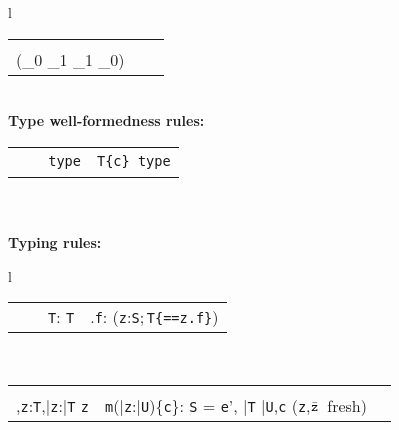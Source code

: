 \begin{figure*}
\begin{tabular}{l}
{\begin{tabular}{p{}p{}p{}}
&
\infrule[Equals]
        {\Gamma \vdash {\tt t}_0: {\tt T}_0
        \andalso
        \Gamma \vdash {\tt t}_1: {\tt T}_1 \\
          (\Gamma \vdash {\tt T}_0 \subtype {\tt T}_1 \vee
          \Gamma \vdash {\tt T}_1 \subtype {\tt T}_0)}
        {\Gamma \vdash {\tt t}_0{\tt ==}{\tt t}_1:o}
\\
\end{tabular}}
\quad\\
{\bf Type well-formedness rules:}\\[-12pt]
{\tabcolsep=0pt
\begin{tabular}{p{}p{}p{}}
\infrule[Class]
	{\Gamma \vdash \klass({\tt C})}
	{\Gamma \vdash {\tt C}\ \type} 
&
\infrule[Exists-T]
	{\Gamma\tt \vdash {\tt S}\ \type, {\tt T}\ \type}
	{\Gamma\tt \vdash {\tt x:S;T}\ {\tt type}} 
&
\infrule[Dep]
	{\Gamma\tt \vdash T\ \type \andalso \Gamma, \self:T \vdash c:o}
	{\Gamma\tt \vdash T\{c\}\ {\tt type}} 
\\
\end{tabular}}
\quad\\
\quad\\
{\bf Typing rules:}\\[-12pt]
{\tabcolsep=0pt
\begin{tabular}{l}
\begin{tabular}{p{}p{}p{}}
\infax[T-Var]
      {\Gamma, {\tt x}:{\tt T} \vdash {\tt x}:{\tt T\{\self==x\}}}
&
\infrule[T-Cast]
	{\Gamma \vdash {\tt e}:{\tt U} \andalso \Gamma \vdash {\tt T} \ \type}
	{\Gamma \vdash {\tt e}\ \as\ {\tt T}: {\tt T}} &
\infrule[T-Field]
	{\Gamma \vdash {\tt e}: {\tt S} \andalso \Gamma,{\tt z}:{\tt S}\vdash {\tt z}\ \has\ {\tt f}:{\tt T} \andalso \mbox{({\tt z} fresh)} }
	{\Gamma \vdash {\tt e}.{\tt f}:  ({\tt z}:{\tt S};\,{\tt T\{\self==z.f\}})}
\end{tabular}\\[-12pt]
\begin{tabular}{p{}p{}} 
\infrule[T-Invk]
	{\Gamma \vdash {\tt e}:{\tt T},\bar{\tt e}:\bar{\tt T} \andalso \\
	  \Gamma,{\tt z}:{\tt T},\bar{\tt z}:\bar{\tt T} \vdash
		{\tt z}\ \has\ {\tt m}(\bar{\tt z}:\bar{\tt U})\{{\tt c}\}: {\tt S} = {\tt e}', 
		\bar{\tt T} \subtype \bar{\tt U},{\tt c} 
	  \andalso \mbox{({\tt z},$\bar{\tt z}$ fresh)}}
	{\Gamma \vdash {\tt e}.{\tt m}(\bar{\tt e}):
                ({\tt z}:{\tt T};\,\bar{\tt z}:\bar{\tt T};\,{\tt S})}

\end{tabular}
\end{tabular}}
\end{tabular}
\end{figure*}
